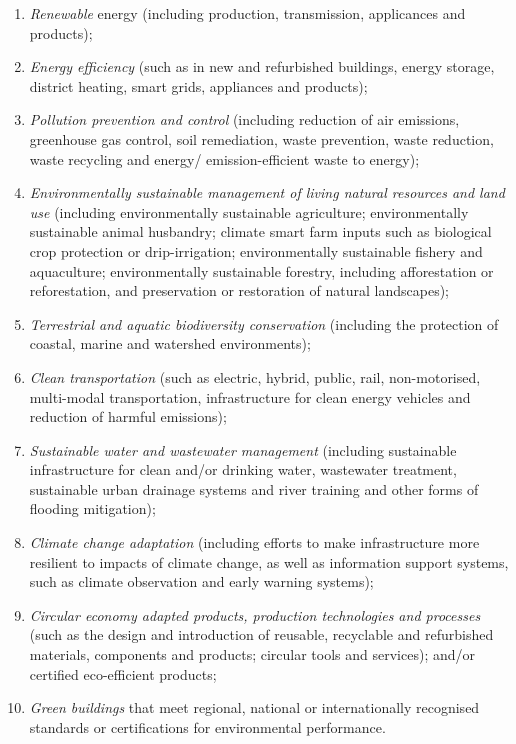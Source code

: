 \begin{enumerate}
    \item \textit{Renewable} energy (including production, transmission, applicances and products);
    \item \textit{Energy efficiency} (such as in new and refurbished buildings, energy storage, district heating, smart grids, appliances and products);
    \item \textit{Pollution prevention and control} (including reduction of air emissions, greenhouse gas control, soil remediation, waste prevention, waste reduction, waste recycling and energy/ emission-efficient waste to energy);
    \item \textit{Environmentally sustainable management of living natural resources and land use} (including environmentally sustainable agriculture; environmentally sustainable animal husbandry; climate smart farm inputs such as biological crop protection or drip-irrigation; environmentally sustainable fishery and aquaculture; environmentally sustainable forestry, including afforestation or reforestation, and preservation or restoration of natural landscapes);
    \item \textit{Terrestrial and aquatic biodiversity conservation} (including the protection of coastal, marine and watershed environments);
    \item \textit{Clean transportation} (such as electric, hybrid, public, rail, non-motorised, multi-modal transportation, infrastructure for clean energy vehicles and reduction of harmful emissions);
    \item \textit{Sustainable water and wastewater management} (including sustainable infrastructure for clean and/or drinking water, wastewater treatment, sustainable urban drainage systems and river training and other forms of flooding mitigation);
    \item \textit{Climate change adaptation} (including efforts to make infrastructure more resilient to impacts of climate change, as well as information support systems, such as climate observation and early warning systems);
    \item \textit{Circular economy adapted products, production technologies and processes} (such as the design and introduction of reusable, recyclable and refurbished materials, components and products; circular tools and services); and/or certified eco-efficient products;
    \item \textit{Green buildings} that meet regional, national or internationally recognised standards or certifications for environmental performance.
\end{enumerate}

